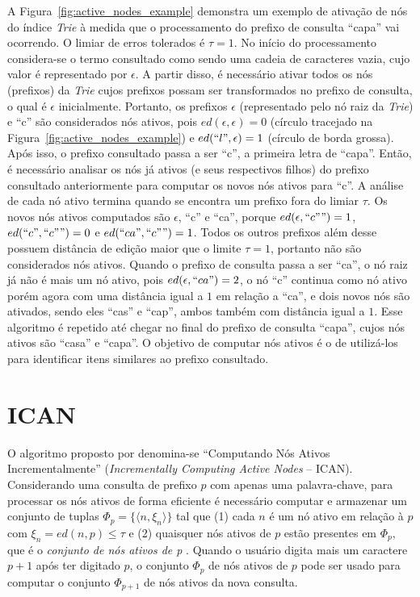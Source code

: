 A Figura~\ref{fig:active_nodes_example} demonstra um exemplo de ativação de nós do índice \textit{Trie} à medida que o processamento do prefixo de consulta ``capa'' vai ocorrendo. O limiar de erros tolerados é $\tau = 1$. No início do processamento considera-se o termo consultado como sendo uma cadeia de caracteres vazia, cujo valor é representado por $\epsilon$. A partir disso, é necessário ativar todos os nós (prefixos) da \textit{Trie} cujos prefixos possam ser transformados no prefixo de consulta, o qual é $\epsilon$ inicialmente. Portanto, os prefixos $\epsilon$ (representado pelo nó raiz da \textit{Trie}) e ``c'' são considerados nós ativos, pois $ed(\epsilon, \epsilon) = 0$ (círculo tracejado na Figura~\ref{fig:active_nodes_example}) e $ed(``l", \epsilon) = 1$ (círculo de borda grossa). Após isso, o prefixo consultado passa a ser ``c'', a primeira letra de ``capa''. Então, é necessário analisar os nós já ativos (e seus respectivos filhos) do prefixo consultado anteriormente para computar os novos nós ativos para ``c''. A análise de cada nó ativo termina quando se encontra um prefixo fora do limiar $\tau$. Os novos nós ativos computados são $\epsilon$, ``c'' e ``ca'', porque $ed(\epsilon, ``c"") = 1$, $ed(``c", ``c"") = 0$ e $ed(``ca", ``c"") = 1$. Todos os outros prefixos além desse possuem distância de edição maior que o limite $\tau = 1$, portanto não são considerados nós ativos. Quando o prefixo de consulta passa a ser ``ca'', o nó raiz já não é mais um nó ativo, pois $ed(\epsilon, ``ca") = 2$, o nó ``c'' continua como nó ativo porém agora com uma distância igual a $1$ em relação a ``ca'', e dois novos nós são ativados, sendo eles  ``cas'' e ``cap'', ambos também com distância igual a $1$. Esse algoritmo é repetido até chegar no final do prefixo de consulta ``capa'', cujos nós ativos são ``casa'' e ``capa''. O objetivo de computar nós ativos é o de utilizá-los para identificar itens similares ao prefixo consultado.

\section{ICAN}

O algoritmo proposto por \cite{ji2009efficient} denomina-se ``Computando Nós Ativos Incrementalmente'' (\textit{Incrementally Computing Active Nodes } -- ICAN). Considerando uma consulta de prefixo $p$ com apenas uma palavra-chave, para processar os nós ativos de forma eficiente é necessário computar e armazenar um conjunto de tuplas $\Phi_{p} = \{ \langle n, \xi_{n} \rangle \}$ tal que (1) cada $n$ é um nó ativo em relação à $p$ com $\xi_{n} = ed(n, p) \leq \tau$ e (2) quaisquer nós ativos de $p$ estão presentes em $\Phi_{p}$, que é o \textit{conjunto de nós ativos de p} \citep{ji2009efficient}. Quando o usuário digita mais um caractere $p + 1$ após ter digitado $p$, o conjunto $\Phi_{p}$ de nós ativos de $p$ pode ser usado para computar o conjunto $\Phi_{p + 1}$ de nós ativos da nova consulta.

